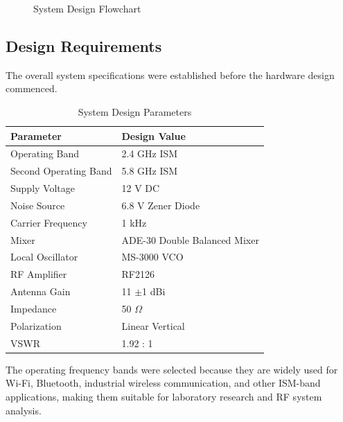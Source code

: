 \documentclass[12pt,a4paper]{report}
\begin{document}
\begin{figure}[htbp]
		\caption{System Design Flowchart}
		\label{fig:system_flow}
	\end{figure}
	
	\subsection{Design Requirements}
	The overall system specifications were established before the hardware design commenced. 
	\begin{table}[htbp]
		\centering
		\caption{System Design Parameters}
		\label{tab:design_parameters}
		\begin{tabular}{p{5cm} p{5cm}}
			\toprule
			\textbf{Parameter} & \textbf{Design Value} \\
			\midrule
			Operating Band & 2.4 GHz ISM \\
			Second Operating Band & 5.8 GHz ISM \\
			Supply Voltage & 12 V DC \\
			Noise Source & 6.8 V Zener Diode \\
			Carrier Frequency & 1 kHz \\
			Mixer & ADE-30 Double Balanced Mixer \\
			Local Oscillator & MS-3000 VCO \\
			RF Amplifier & RF2126 \\
			Antenna Gain & 11 $\pm$1 dBi \\
			Impedance & 50 $\Omega$ \\
			Polarization & Linear Vertical \\
			VSWR & 1.92 : 1 \\
			\bottomrule
		\end{tabular}
	\end{table}
	
	The operating frequency bands were selected because they are widely used for Wi-Fi, Bluetooth, industrial wireless communication, and other ISM-band applications, making them suitable for laboratory research and RF system analysis.
	
\end{document}
